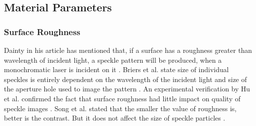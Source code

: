 \vspace{5mm}
\subsection{Material Parameters}

    \subsubsection{Surface Roughness}
    Dainty in his article has mentioned that, if a surface has a roughness greater than wavelength of incident light, a speckle pattern will be produced, when a monochromatic laser is incident on it \cite{dainty}. Briers et al. state size of individual speckles is entirely dependent on the wavelength of the incident light and size of the aperture hole used to image the pattern \cite{briers}. An experimental verification by Hu et al. confirmed the fact that surface roughness had little impact on quality of speckle images \cite{hu}. Song et al. stated that the smaller the value of roughness is, better is the contrast. But it does not affect the size of speckle particles \cite{song}.
    

